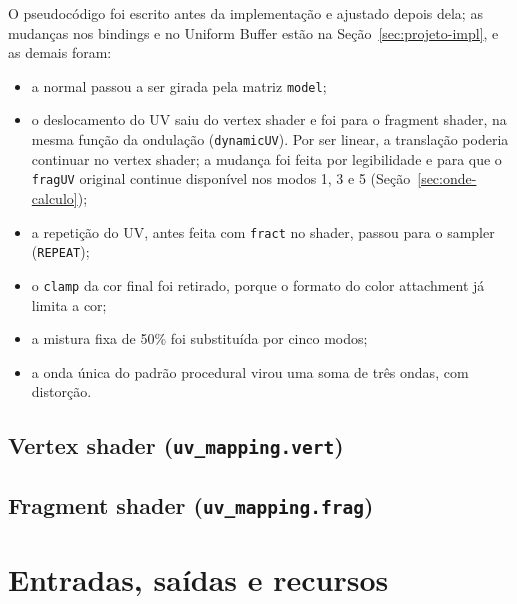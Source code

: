 O pseudocódigo foi escrito antes da implementação e ajustado depois dela; as mudanças nos bindings e no Uniform Buffer estão na Seção~\ref{sec:projeto-impl}, e as demais foram:
\begin{itemize}
    \item a normal passou a ser girada pela matriz \texttt{model};
    \item o deslocamento do UV saiu do vertex shader e foi para o fragment shader, na mesma função da ondulação (\texttt{dynamicUV}). Por ser linear, a translação poderia continuar no vertex shader; a mudança foi feita por legibilidade e para que o \texttt{fragUV} original continue disponível nos modos 1, 3 e 5 (Seção~\ref{sec:onde-calculo});
    \item a repetição do UV, antes feita com \texttt{fract} no shader, passou para o sampler (\texttt{REPEAT});
    \item o \texttt{clamp} da cor final foi retirado, porque o formato do color attachment já limita a cor;
    \item a mistura fixa de 50\% foi substituída por cinco modos;
    \item a onda única do padrão procedural virou uma soma de três ondas, com distorção.
\end{itemize}

\subsection{Vertex shader (\texttt{uv\_mapping.vert})}


\subsection{Fragment shader (\texttt{uv\_mapping.frag})}


\section{Entradas, saídas e recursos}

